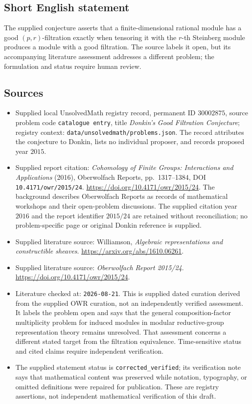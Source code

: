 \documentclass[11pt]{article}
\begin{document}
\subsection{Short English statement}
The supplied conjecture asserts that a finite-dimensional rational module has a good \((p,r)\)-filtration exactly when tensoring it with the \(r\)-th Steinberg module produces a module with a good filtration. The source labels it open, but its accompanying literature assessment addresses a different problem; the formulation and status require human review.
\subsection{Sources}
\begin{itemize}
\item Supplied local UnsolvedMath registry record, permanent ID \(30002875\), source problem code \texttt{catalogue entry}, title \emph{Donkin's Good Filtration Conjecture}; registry context: \texttt{data/unsolvedmath/problems.json}. The record attributes the conjecture to Donkin, lists no individual proposer, and records proposed year \(2015\).
\item Supplied report citation: \emph{Cohomology of Finite Groups: Interactions and Applications} (2016), Oberwolfach Reports, pp.\ 1317--1384, DOI \texttt{10.4171/owr/2015/24}. \url{https://doi.org/10.4171/owr/2015/24}. The background describes Oberwolfach Reports as records of mathematical workshops and their open-problem discussions. The supplied citation year \(2016\) and the report identifier \(2015/24\) are retained without reconciliation; no problem-specific page or original Donkin reference is supplied.
\item Supplied literature source: Williamson, \emph{Algebraic representations and constructible sheaves}. \url{https://arxiv.org/abs/1610.06261}.
\item Supplied literature source: \emph{Oberwolfach Report 2015/24}. \url{https://doi.org/10.4171/owr/2015/24}.
\item Literature checked at: \texttt{2026-08-21}. This is supplied dated curation derived from the supplied OWR curation, not an independently verified assessment. It labels the problem open and says that the general composition-factor multiplicity problem for induced modules in modular reductive-group representation theory remains unresolved. That assessment concerns a different stated target from the filtration equivalence. Time-sensitive status and cited claims require independent verification.
\item The supplied statement status is \texttt{corrected\_verified}; its verification note says that mathematical content was preserved while notation, typography, or omitted definitions were repaired for publication. These are registry assertions, not independent mathematical verification of this draft.
\end{itemize}
\end{document}

